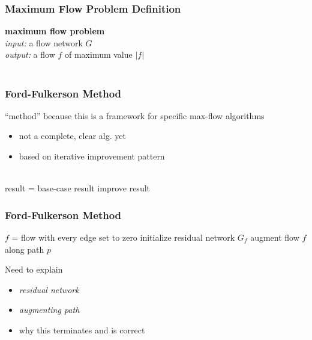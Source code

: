 \documentclass{beamer}
\newcommand{\stanza}{ \\~\ }
\begin{document}
\begin{frame} \frametitle{Maximum Flow Problem Definition}
\textbf{maximum flow problem} \\
\emph{input:} a flow network $G$ \\
\emph{output:} a flow $f$ of maximum value $|f|$ \stanza
\end{frame}

\begin{frame} \frametitle{Ford-Fulkerson Method}
``method'' because this is a framework for specific max-flow algorithms
\begin{itemize}
  \item not a complete, clear alg. yet
  \item based on iterative improvement pattern \stanza
\end{itemize}

{\footnotesize
\begin{algorithmic}[1]
  \State result = base-case result
    \State improve result
  \EndWhile
  \State {}
  \EndFunction
\end{algorithmic}
}

\end{frame}

\begin{frame} \frametitle{Ford-Fulkerson Method}
{\footnotesize
\begin{algorithmic}[1]
  \State $f$ = flow with every edge set to zero
  \State initialize residual network $G_f$
    \State augment flow $f$ along path $p$
  \EndWhile
  \State {}
  \EndFunction
\end{algorithmic}
}
\vspace{.5cm}

Need to explain
\begin{itemize}
  \item \emph{residual network}
  \item \emph{augmenting path}
  \item why this terminates and is correct
\end{itemize}
\end{frame}
\end{document}
